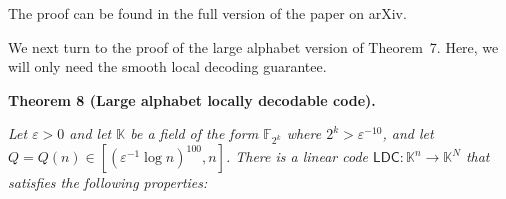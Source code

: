 \documentclass[10pt,a4paper]{article}
\begin{document}



The proof can be found in the full version of the paper on arXiv.\par




We next turn to the proof of the large alphabet version of Theorem 7. Here, we will only need the smooth local decoding guarantee.\par





\par\medskip\noindent\textbf{
\textbf{Theorem 8}\textbf{ }(Large alphabet locally decodable code)\textbf{.}
}\par



\emph{Let $\varepsilon>0$ and let $\mathbb{K}$ be a field of the form $\mathbb{F}_{2^{k}}$ where $2^{k}>\varepsilon^{-10}$, and let $Q=Q(n)\in[(\varepsilon^{-1}\log n)^{100},n]$. There is a linear code $\mathsf{LDC}:\mathbb{K}^{n}\rightarrow\mathbb{K}^{N}$
that satisfies the following properties:}\par
\end{document}
